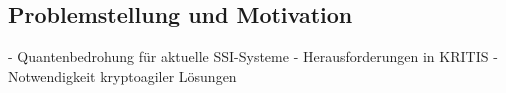 \subsection{Problemstellung und Motivation} \label{sec:Problemstellung und Motivation}

- Quantenbedrohung für aktuelle SSI-Systeme
- Herausforderungen in KRITIS
- Notwendigkeit kryptoagiler Lösungen